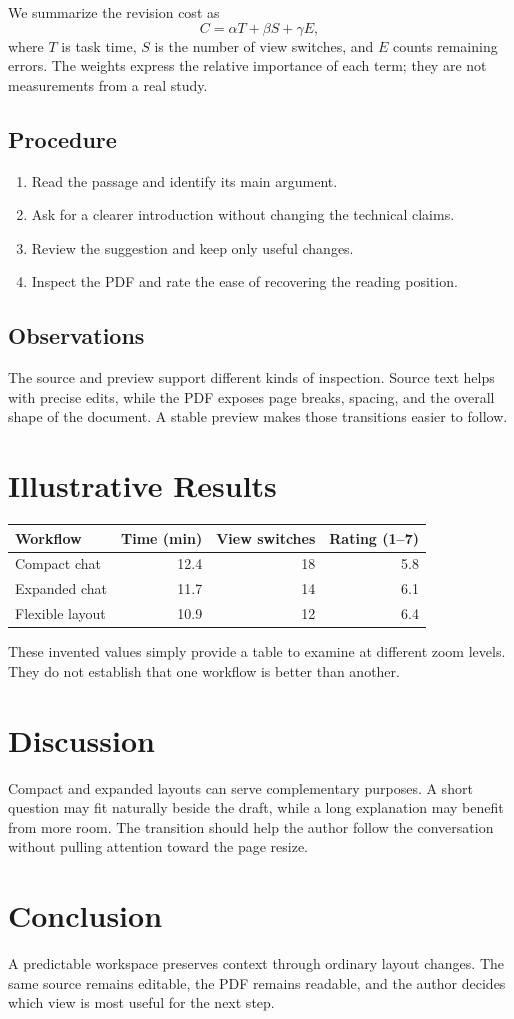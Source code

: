 \documentclass[11pt,a4paper]{article}
\begin{document}
We summarize the revision cost as
\begin{equation}
C = \alpha T + \beta S + \gamma E,
\end{equation}
where $T$ is task time, $S$ is the number of view switches, and $E$ counts
remaining errors. The weights express the relative importance of each term;
they are not measurements from a real study.

\subsection{Procedure}
\begin{enumerate}
\item Read the passage and identify its main argument.
\item Ask for a clearer introduction without changing the technical claims.
\item Review the suggestion and keep only useful changes.
\item Inspect the PDF and rate the ease of recovering the reading position.
\end{enumerate}
\subsection{Observations}
The source and preview support different kinds of inspection. Source text
helps with precise edits, while the PDF exposes page breaks, spacing, and the
overall shape of the document. A stable preview makes those transitions easier
to follow.

\newpage
\section{Illustrative Results}
\begin{center}
\begin{tabular}{lrrr}
\hline
Workflow & Time (min) & View switches & Rating (1--7) \\
\hline
Compact chat & 12.4 & 18 & 5.8 \\
Expanded chat & 11.7 & 14 & 6.1 \\
Flexible layout & 10.9 & 12 & 6.4 \\
\hline
\end{tabular}
\end{center}
These invented values simply provide a table to examine at different zoom
levels. They do not establish that one workflow is better than another.

\section{Discussion}
Compact and expanded layouts can serve complementary purposes. A short
question may fit naturally beside the draft, while a long explanation may
benefit from more room. The transition should help the author follow the
conversation without pulling attention toward the page resize.

\section{Conclusion}
A predictable workspace preserves context through ordinary layout changes.
The same source remains editable, the PDF remains readable, and the author
decides which view is most useful for the next step.
\end{document}
